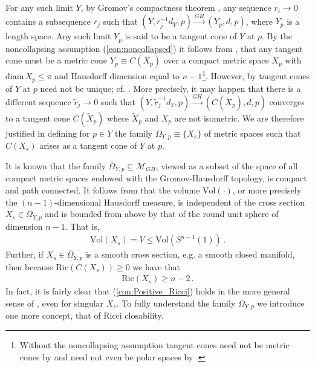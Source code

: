 \documentclass[11pt]{article}
\newcommand{\Ric}{\text{Ric}}
\newcommand{\Vol}{\text{Vol}}
\newcommand{\diam}{\text{diam}}
\newcommand{\cM}{\mathcal{M}}
\begin{document}
For any such limit $Y$, by Gromov's compactness theorem \cite{GLP,G}, any sequence $r_i\rightarrow 0$ contains a subsequence $r_j$ such that $(Y,r_j^{-1}d_Y,p)\stackrel{GH}{\rightarrow}(Y_p,d,p)$, where $Y_p$ is a length space.  Any such limit $Y_p$ is said to be a tangent cone of $Y$ at $p$.  By the noncollapsing assumption (\ref{con:noncollapsed}) it follows from \cite{ChC1}, \cite{ChC2} that any tangent cone must be a metric cone $Y_p\equiv C(X_p)$ over a compact metric space $X_p$ with $\diam\, X_p\leq \pi$ and Hausdorff dimension equal to $n-1$\footnote{Without the noncollapsing assumption tangent cones need not be metric cones by \cite{ChC2} and need not even be polar spaces by \cite{M4}.}.  However, by \cite{ChC2} tangent cones of $Y$ at $p$ need not be unique; cf. \cite{P2}.  More precisely, it may happen that there is a different sequence $\tilde r_j\rightarrow 0$ such that $(Y,\tilde r_j^{-1}d_Y,p)\stackrel{GH}{\rightarrow}(C(\tilde X_p),d,p)$ converges to a tangent cone $C(\tilde X_p)$ where $\tilde X_p$ and $X_p$ are not isometric.  We are therefore justified in defining for $p\in Y$ the family $\overline\Omega_{Y,p}\equiv \{X_s\}$ of metric spaces such that $C(X_s)$ arises as a tangent cone of $Y$ at $p$.

It is known that the family $\overline\Omega_{Y,p}\subseteq \cM_{GH}$, viewed as a subset of the space of all compact metric spaces endowed with the Gromov-Hausdorff topology, is compact and path connected.  It follows from \cite{ChC2} that the volume $\Vol (\cdot)$, or more precisely the $(n-1)$-dimensional Hausdorff measure, is independent of the cross section $X_s\in\overline\Omega_{Y,p}$ and is bounded from above by that of the round unit sphere of dimension $n-1$.  That is, 
\begin{align}\label{con:Volume_Constant}
 \Vol(X_s) = V\leq \Vol(S^{n-1}(1))\, .
\end{align}
Further, if $X_s\in\overline\Omega_{Y,p}$ is a smooth cross section, e.g. a smooth closed manifold, then because $\Ric(C(X_s))\geq 0$ we have that 
\begin{align}\label{con:Positive_Ricci}
 \Ric(X_s)\geq n-2\, .
\end{align}
In fact, it is fairly clear that (\ref{con:Positive_Ricci}) holds in the more general sense of \cite{LV}, \cite{S} even for singular $X_s$.  To fully understand the family $\overline\Omega_{Y,p}$ we introduce one more concept, that of Ricci closability.
\end{document}
